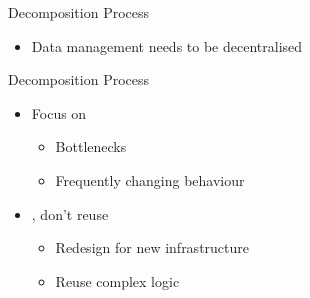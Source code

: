 \documentclass{slide}
\begin{document}
\begin{frame}{Decomposition Process}
{\begin{itemize}[<+->]
{\begin{itemize}
\begin{itemize}
                     \begin{itemize}
                         \Large\item Slice of cake analogy, you want a vertical slice containing all layers,
                                     not just the icing on top
                     \end{itemize}
                 \end{itemize}
                 \vspace{0.3em}
                 \item Data management needs to be decentralised
             \end{itemize}
            }
\end{itemize}
}
\end{frame}

\begin{frame}{Decomposition Process}
\vspace{1pt}
{\huge
\begin{itemize}[<+->]
    \item Focus on 
    \begin{itemize}[<1->]
        \LARGE\item Bottlenecks
        \LARGE\item Frequently changing behaviour
    \end{itemize}
    \vspace{3mm}
    \item {}, don't reuse
    \begin{itemize}[<2->]
        \LARGE\item Redesign for new infrastructure
        \vspace{2mm}
        \LARGE\item Reuse complex logic
        \vspace{-1mm}
        \begin{itemize}[<2->]

\end{itemize}
\end{itemize}
\end{itemize}}
\end{frame}
\end{document}
